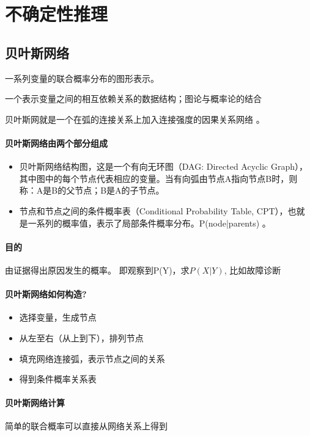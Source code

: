 \documentclass[UTF8,a4paper]{ctexart}
\begin{document}
\section{不确定性推理}
\subsection{贝叶斯网络}
一系列变量的联合概率分布的图形表示。

一个表示变量之间的相互依赖关系的数据结构；图论与概率论的结合

贝叶斯网就是一个在弧的连接关系上加入连接强度的因果关系网络 。

\paragraph{贝叶斯网络由两个部分组成}
\begin{itemize}
	\item 贝叶斯网络结构图，这是一个有向无环图（DAG: Directed Acyclic Graph），其中图中的每个节点代表相应的变量。当有向弧由节点A指向节点B时，则称：A是B的父节点；B是A的子节点。
	\item 节点和节点之间的条件概率表（Conditional Probability Table, CPT），也就是一系列的概率值，表示了局部条件概率分布。P(node|parents) 。
\end{itemize}

\paragraph{目的} 由证据得出原因发生的概率。 即观察到P(Y)，求$P(X|Y)$, 比如故障诊断

\paragraph{贝叶斯网络如何构造?}
\begin{itemize}
	\item 选择变量，生成节点
	\item 从左至右（从上到下），排列节点
	\item 填充网络连接弧，表示节点之间的关系
	\item 得到条件概率关系表
\end{itemize}

\paragraph{贝叶斯网络计算} 简单的联合概率可以直接从网络关系上得到
\end{document}
